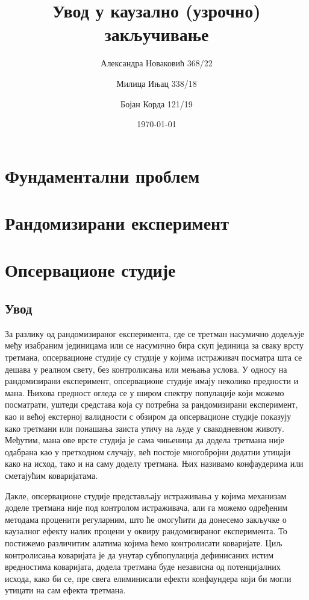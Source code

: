 \documentclass[12pt, a4paper]{article}
\title{Увод у каузално (узрочно) закључивање}
\author{Александра Новаковић 368/22}
\author{Милица Ињац 338/18}
\author{Бојан Корда 121/19}
\affil{Математички факултет, Универзитет у Београду}
\date{\today}
\begin{document}
\maketitle
\newpage

\tableofcontents
\newpage

\section{Фундаментални проблем}
\newpage



\section{Рандомизирани експеримент}
\newpage



\section{Опсервационе студије}
\subsection{Увод}
За разлику од рандомизираног експеримента, где се третман насумично додељује међу изабраним јединицама или се насумично бира скуп јединица за сваку врсту третмана, опсервационе студије су студије у којима истраживач посматра шта се дешава у реалном свету, без контролисања или мењања услова. У односу на рандомизирани експеримент, опсервационе студије имају неколико предности и мана. Њихова предност огледа се у широм спектру популације који можемо посматрати, уштеди средстава која су потребна за рандомизирани експеримент, као и већој екстерној валидности с обзиром да опсервационе студије показују како третмани или понашања заиста утичу на људе у свакодневном животу. Међутим, мана ове врсте студија је сама чињеница да додела третмана није одабрана као у претходном случају, већ постоје многобројни додатни утицаји како на исход, тако и на саму доделу третмана. Њих називамо конфаудерима или сметајућим коваријатама. 

Дакле, опсервационе студије представљају истраживања у којима механизам доделе третмана није под контролом истраживача, али га можемо одређеним методама проценити регуларним, што ће омогућити да донесемо закључке о каузалног ефекту налик процени у оквиру рандомизираног експеримента. То постижемо различитим алатима којима ћемо контролисати коваријате. Циљ контролисања коваријата је да унутар субпопулација дефинисаних истим вредностима коваријата, додела третмана буде независна од потенцијалних исхода, како би се, пре свега елиминисали ефекти конфаундера који би могли утицати на сам ефекта третмана.
\end{document}
